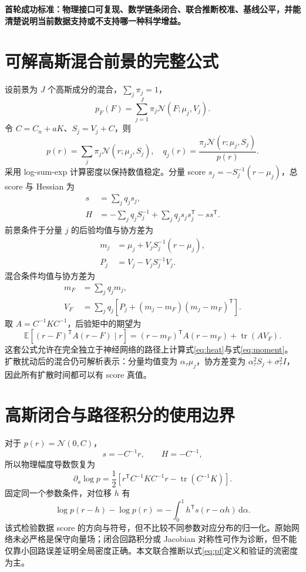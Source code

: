 \documentclass[UTF8,fontset=fandol,a4paper,11pt]{ctexart}
\numberwithin{equation}{section}
\newcommand{\E}{\mathbb E}
\newcommand{\tr}{\operatorname{tr}}
\newcommand{\dd}{\mathrm d}
\newcommand{\Normal}{\mathcal N}
\newcommand{\key}[1]{\par\smallskip\noindent\colorbox{pale}{\parbox{\dimexpr\linewidth-2\fboxsep\relax}{\textbf{#1}}}\par\smallskip}
\begin{document}
\key{首轮成功标准：物理接口可复现、数学链条闭合、联合推断校准、基线公平，并能清楚说明当前数据支持或不支持哪一种科学增益。}

\appendix
\section{可解高斯混合前景的完整公式}
设前景为 $J$ 个高斯成分的混合，$\sum_j\pi_j=1$，
\begin{equation}
p_F(F)=\sum_{j=1}^{J}\pi_j\Normal(F;\mu_j,V_j).
\end{equation}
令 $C=C_n+aK$、$S_j=V_j+C$，则
\begin{equation}
p(r)=\sum_j\pi_j\Normal(r;\mu_j,S_j),\quad
q_j(r)=\frac{\pi_j\Normal(r;\mu_j,S_j)}{p(r)}.
\end{equation}
采用 log-sum-exp 计算密度以保持数值稳定。分量 score $s_j=-S_j^{-1}(r-\mu_j)$，总 score 与 Hessian 为
\begin{align}
s&=\sum_jq_js_j,\\
H&=-\sum_jq_jS_j^{-1}+\sum_jq_js_js_j^{\mathsf T}-ss^{\mathsf T}.
\end{align}
前景条件于分量 $j$ 的后验均值与协方差为
\begin{align}
m_j&=\mu_j+V_jS_j^{-1}(r-\mu_j),\\
P_j&=V_j-V_jS_j^{-1}V_j.
\end{align}
混合条件均值与协方差为
\begin{align}
m_F&=\sum_jq_jm_j,\\
V_F&=\sum_jq_j\left[P_j+(m_j-m_F)(m_j-m_F)^{\mathsf T}\right].
\end{align}
取 $A=C^{-1}KC^{-1}$，后验矩中的期望为
\begin{equation}
\E[(r-F)^{\mathsf T}A(r-F)\mid r]
=(r-m_F)^{\mathsf T}A(r-m_F)+\tr(AV_F).
\end{equation}
这套公式允许在完全独立于神经网络的路径上计算式\eqref{eq:heat}与式\eqref{eq:moment}。扩散扰动后的混合仍可解析表示：分量均值变为 $\alpha_\tau\mu_j$，协方差变为 $\alpha_\tau^2S_j+\sigma_\tau^2I$，因此所有扩散时间都可以有 score 真值。

\section{高斯闭合与路径积分的使用边界}
对于 $p(r)=\Normal(0,C)$，
\begin{equation}
s=-C^{-1}r,\qquad H=-C^{-1},
\end{equation}
所以物理幅度导数恢复为
\begin{equation}
\partial_a\log p=
\frac12\left[r^{\mathsf T}C^{-1}KC^{-1}r-\tr(C^{-1}K)\right].
\end{equation}
固定同一个参数条件，对位移 $h$ 有
\begin{equation}
\log p(r-h)-\log p(r)
=-\int_0^1h^{\mathsf T}s(r-\alpha h)\,\dd\alpha.
\end{equation}
该式检验数据 score 的方向与符号，但不比较不同参数对应分布的归一化。原始网络未必严格是保守向量场；闭合回路积分或 Jacobian 对称性可作为诊断，但不能仅靠小回路误差证明全局密度正确。本文联合推断以式\eqref{eq:pf}定义和验证的流密度为主。
\end{document}
